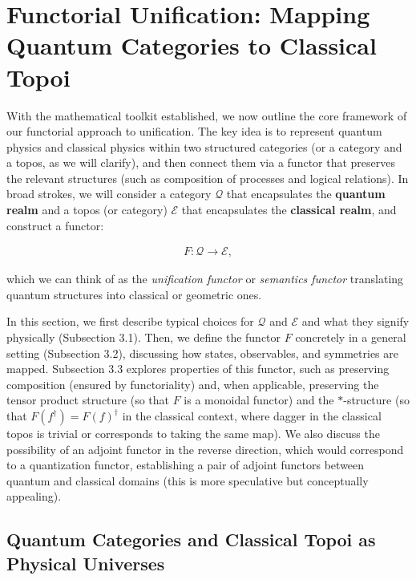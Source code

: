 \section{Functorial Unification: Mapping Quantum Categories to Classical Topoi}\label{sec:functorial-mapping}

With the mathematical toolkit established, we now outline the core framework of our functorial approach to unification. The key idea is to represent quantum physics and classical physics within two structured categories (or a category and a topos, as we will clarify), and then connect them via a functor that preserves the relevant structures (such as composition of processes and logical relations). In broad strokes, we will consider a category $\mathcal{Q}$ that encapsulates the \textbf{quantum realm} and a topos (or category) $\mathcal{E}$ that encapsulates the \textbf{classical realm}, and construct a functor:

\begin{align}
F: \mathcal{Q} \to \mathcal{E},
\end{align}

which we can think of as the \emph{unification functor} or \emph{semantics functor} translating quantum structures into classical or geometric ones.

\medskip

In this section, we first describe typical choices for $\mathcal{Q}$ and $\mathcal{E}$ and what they signify physically (Subsection 3.1). Then, we define the functor $F$ concretely in a general setting (Subsection 3.2), discussing how states, observables, and symmetries are mapped. Subsection 3.3 explores properties of this functor, such as preserving composition (ensured by functoriality) and, when applicable, preserving the tensor product structure (so that $F$ is a monoidal functor) and the $*$-structure (so that $F(f^\dagger) = F(f)^\dagger$ in the classical context, where dagger in the classical topos is trivial or corresponds to taking the same map). We also discuss the possibility of an adjoint functor in the reverse direction, which would correspond to a quantization functor, establishing a pair of adjoint functors between quantum and classical domains (this is more speculative but conceptually appealing).

\subsection{Quantum Categories and Classical Topoi as Physical Universes}

